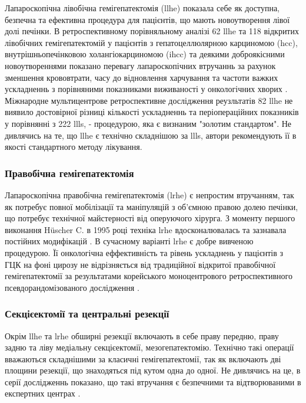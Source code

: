 \begin{refsection}
Лапароскопічна лівобічна гемігепатектомія (\acrshort{llhe}) показала себе як доступна, безпечна та ефективна процедура для пацієнтів, що мають новоутворення лівої долі печінки. В ретроспективному порівняльному аналізі 62 \acrshort{llhe} та 118 відкритих лівобічних гемігепатектомій у пацієнтів з гепатоцеллюлярною карциномою (\acrshort{hcc}), внутрішньопечінковою холангіокарциномою (\acrshort{ihcc}) та деякими доброякісними новоутвореннями показано перевагу лапароскопічних втручаннь за рахунок зменшення крововтрати, часу до відновлення харчування та частоти важких ускладненнь з порівняними показниками виживаності у онкологічних хворих \cite{Cho2018b}.   Міжнародне мультицентрове ретроспективне дослідження реузльтатів 82 \acrshort{llhe} \cite{Belli2013a} не виявило достовірної різниці кількості ускладненнь та періопераційних показників у порівнянні з 222 \acrshort{llls}, - процедурою, яка є визнаним "золотим стандартом". Не дивлячись на те, що \acrshort{llhe} є технічно складнішою за \acrshort{llls}, автори рекомендують її в якості стандартного методу лікування.

\subsubsection{Правобічна гемігепатектомія}

Лапароскопічна правобічна гемігепатектомія (\acrshort{lrhe}) є непростим втручанням, так як потребує повної мобілізації та маніпуляцій з об'ємною правою долею печінки, що потребує технічної майстерності від оперуючого хірурга. З моменту першого виконання Hüscher C. в 1995 році \cite{Huscher1997} техніка \acrshort{lrhe} вдосконалювалась та зазнавала постійних модифікацій \cite{Gayet2007, Dagher2008, Homma2019, Kim2017a}. В сучасному варіанті \acrshort{lrhe} є добре вивченою процедурою. Її онкологічна еффективність та рівень ускладнень у пацієнтів з ГЦК на фоні цирозу не відрізняється від традиційної відкритої правобічної гемігепатектомії за результатами корейського моноцентрового ретроспективного псевдорандомізованого дослідження \cite{Yoon2017b}. 

\subsubsection{Секцієектомії та центральні резекції}

Окрім \acrshort{llhe} та \acrshort{lrhe} обширні резекції включають в себе праву передню, праву задню та ліву медіальну секцієектомії, мезогепатектомію. Технічно такі операції вважаються складнішими за класичні гемігепатектомії, так як включають дві площини резекції, що знаходяться під кутом одна до одної. Не дивлячись на це, в серії дослідженнь показано, що такі втручання є безпечними та відтворюваними в експертних центрах \cite{Honda2014, Cheng2015, Kim2017, Siddiqi2018}. 


\end{refsection}
